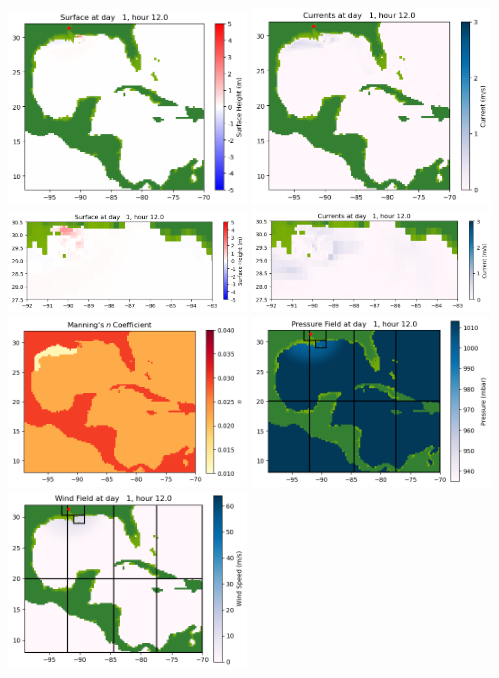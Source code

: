 \documentclass[11pt]{article}
\begin{document}
\vskip 10pt 
\includegraphics[width=0.475\textwidth]{frame0014fig1001.png}
\includegraphics[width=0.475\textwidth]{frame0014fig1002.png}
\vskip 10pt 
\includegraphics[width=0.475\textwidth]{frame0014fig1003.png}
\includegraphics[width=0.475\textwidth]{frame0014fig1004.png}
\vskip 10pt 
\includegraphics[width=0.475\textwidth]{frame0014fig1005.png}
\includegraphics[width=0.475\textwidth]{frame0014fig1006.png}
\vskip 10pt 
\includegraphics[width=0.475\textwidth]{frame0014fig1007.png}
\end{document}
